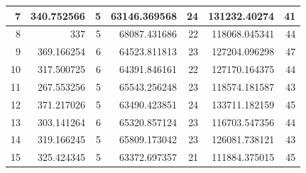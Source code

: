 \begin{table}
\begin{adjustwidth}{}{}
{{\begin{tabular}{|r|r|r|r|r|r|r|}
	\hline
	7                                          & 340.752566                   & 5                                     & 63146.369568                   & 24                                    & 131232.40274                 & 41                                     \\ 
	\hline
	8                                          & 337                          & 5                                     & 68087.431686                   & 22                                    & 118068.045341                & 44                                     \\ 
	\hline
	9                                          & 369.166254                   & 6                                     & 64523.811813                   & 23                                    & 127204.096298                & 47                                     \\ 
	\hline
	10                                         & 317.500725                   & 6                                     & 64391.846161                   & 22                                    & 127170.164375                & 44                                     \\ 
	\hline
	11                                         & 267.553256                   & 5                                     & 65543.256248                   & 23                                    & 118574.181587                & 43                                     \\ 
	\hline
	12                                         & 371.217026                   & 5                                     & 63490.423851                   & 24                                    & 133711.182159                & 45                                     \\ 
	\hline
	13                                         & 303.141264                   & 6                                     & 65320.857124                   & 23                                    & 116703.547356                & 44                                     \\ 
	\hline
	14                                         & 319.166245                   & 5                                     & 65809.173042                   & 23                                    & 126081.738121                & 43                                     \\ 
	\hline
	15                                         & 325.424345                   & 5                                     & 63372.697357                   & 21                                    & 111884.375015                & 45                                     \\ 

\end{tabular}}}
\end{adjustwidth}
\end{table}
